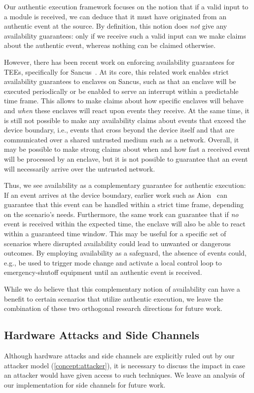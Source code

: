Our authentic execution framework focuses on the notion that if a valid input to
a module is received, we can deduce that it must have originated from an
authentic event at the source. By definition, this notion does \emph{not} give
any availability guarantees: only if we receive such a valid input can we make
claims about the authentic event, whereas nothing can be claimed otherwise.

However, there has been recent work on enforcing availability guarantees for
TEEs, specifically for Sancus~\cite{alder_2021_aion}. At its core, this related
work enables strict availability guarantees to enclaves on Sancus, such as that
an enclave will be executed periodically or be enabled to serve an interrupt
within a predictable time frame. This allows to make claims about how specific
enclaves will behave and \emph{when} these enclaves will react upon events they
receive. At the same time, it is still not possible to make any availability
claims about events that exceed the device boundary, i.e., events that cross
beyond the device itself and that are communicated over a shared untrusted
medium such as a network. Overall, it may be possible to make strong claims
about when and how fast a received event will be processed by an enclave, but it
is not possible to guarantee that an event will necessarily arrive over the
untrusted network.

Thus, we see availability as a complementary guarantee for authentic execution:
If an event arrives at the device boundary, earlier work such as
Aion~\cite{alder_2021_aion} can guarantee that this event can be handled within
a strict time frame, depending on the scenario's needs. Furthermore, the same
work can guarantee that if \emph{no} event is received within the expected time,
the enclave will also be able to react within a guaranteed time window. This may
be useful for a specific set of scenarios where disrupted availability could
lead to unwanted or dangerous outcomes. By employing availability as a
safeguard, the absence of events could, e.g., be used to trigger mode change and
activate a local control loop to emergency-shutoff equipment until an authentic
event is received.

While we do believe that this complementary notion of availability can have a
benefit to certain scenarios that utilize authentic execution, we leave the
combination of these two orthogonal research directions for future work.

\subsection{Hardware Attacks and Side Channels}
%
Although hardware attacks and side channels are explicitly ruled out by our
attacker model (\cref{concept:attacker}), it is necessary to discuss the impact
in case an attacker would have given access to such techniques. We leave an
analysis of our implementation for side channels for future work.

